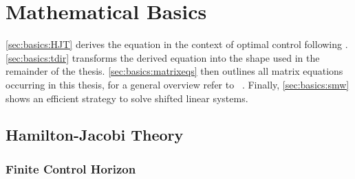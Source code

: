 \chapter{Mathematical Basics}

\autoref{sec:basics:HJT} derives the \Riccati equation in the context of optimal control following \cite{Locatelli2011}.
\autoref{sec:basics:tdir} transforms the derived equation into the shape used in the remainder of the thesis.
\autoref{sec:basics:matrixeqs} then outlines all matrix equations occurring in this thesis,
for a general overview refer to \eg~\cite{Simoncini2016}.
Finally, \autoref{sec:basics:smw} shows an efficient strategy to solve shifted linear systems.

\section{Hamilton-Jacobi Theory}
\label{sec:basics:HJT}

\subsection{Finite Control Horizon}

